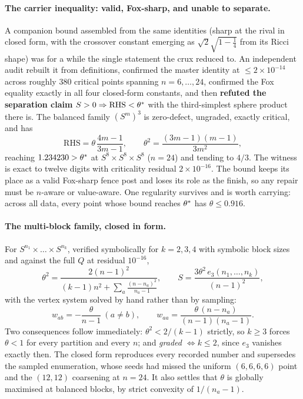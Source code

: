 \paragraph{The carrier inequality: valid, Fox-sharp, and unable to separate.} A companion bound assembled from the same identities (sharp at the rival in closed form, with the crossover constant emerging as $\sqrt2\sqrt{1-\tfrac14}$ from its Ricci shape) was for a while the single statement the crux reduced to. An independent audit rebuilt it from definitions, confirmed the master identity at $\le2\times10^{-14}$ across roughly $380$ critical points spanning $n=6,\dots,24$, confirmed the Fox equality exactly in all four closed-form constants, and then \textbf{refuted the separation claim} $S>0\Rightarrow\mathrm{RHS}<\theta^{*}$ with the third-simplest sphere product there is. The balanced family $(S^m)^3$ is zero-defect, ungraded, exactly critical, and has
\[
\mathrm{RHS}=\theta\,\frac{4m-1}{3m-1},\qquad \theta^2=\frac{(3m-1)(m-1)}{3m^2},
\]
reaching $1.234230>\theta^{*}$ at $S^8\times S^8\times S^8$ ($n=24$) and tending to $4/3$. The witness is exact to twelve digits with criticality residual $2\times10^{-16}$. The bound keeps its place as a valid Fox-sharp fence post and loses its role as the finish, so any repair must be $n$-aware or value-aware. One regularity survives and is worth carrying: across all data, every point whose bound reaches $\theta^{*}$ has $\theta\le0.916$.

\paragraph{The multi-block family, closed in form.} For $S^{n_1}\times\dots\times S^{n_k}$, verified symbolically for $k=2,3,4$ with symbolic block sizes and against the full $Q$ at residual $10^{-16}$,
\[
\theta^2=\frac{2(n-1)^2}{(k-1)n^2+\sum_a\frac{(n-n_a)^2}{n_a-1}},\qquad
S=\frac{3\theta^2\,e_3(n_1,\dots,n_k)}{(n-1)^2},
\]
with the vertex system solved by hand rather than by sampling:
\[
w_{ab}=-\frac{\theta}{n-1}\ (a\ne b),\qquad w_{aa}=\frac{\theta\,(n-n_a)}{(n-1)(n_a-1)} .
\]
Two consequences follow immediately: $\theta^2<2/(k-1)$ strictly, so $k\ge3$ forces $\theta<1$ for every partition and every $n$; and \emph{graded $\iff k\le2$}, since $e_3$ vanishes exactly then. The closed form reproduces every recorded number and supersedes the sampled enumeration, whose seeds had missed the uniform $(6,6,6,6)$ point and the $(12,12)$ coarsening at $n=24$. It also settles that $\theta$ is globally maximised at balanced blocks, by strict convexity of $1/(n_a-1)$.

